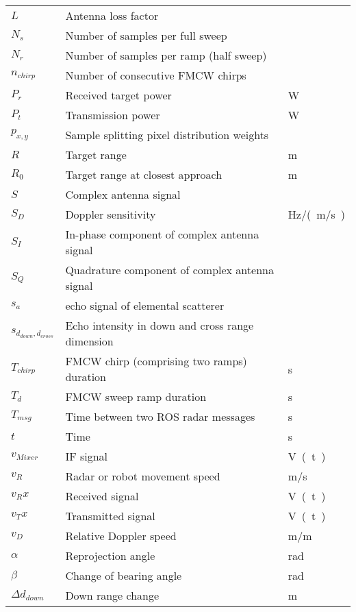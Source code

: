 \begin{listofsymbols}
\begin{tabularx}{\textwidth}{%
  >{\setlength{\hsize}{3cm}\raggedright\arraybackslash}X%
  X%
  >{\setlength{\hsize}{2cm}\raggedright\arraybackslash}X%
}
$L$ & Antenna loss factor                   & \\
$N_s$ & Number of samples per full sweep    & \\
$N_r$ & Number of samples per ramp (half sweep) & \\
$n_{chirp}$ & Number of consecutive FMCW chirps & \\
$P_r$ & Received target power               & \si{W} \\
$P_t$ & Transmission power                  & \si{W} \\
$p_{x,y}$ & Sample splitting pixel distribution weights & \\
$R$   & Target range                        & \si{m} \\
$R_0$ & Target range at closest approach    & \si{m} \\
$S$   & Complex antenna signal              & \\
$S_D$ & Doppler sensitivity                 & \si{Hz/(m/s)}\\
$S_I$ & In-phase component of complex antenna signal & \\
$S_Q$ & Quadrature component of complex antenna signal & \\
$s_a$ & echo signal of elemental scatterer  & \\
$s_{d_{down},d_{cross}}$ & Echo intensity in down and cross range dimension & \\
$T_{chirp}$ & FMCW chirp (comprising two ramps) duration & \si{s} \\
$T_d$ & FMCW sweep ramp duration            & \si{s} \\
$T_{msg}$ & Time between two ROS radar messages & \si{s} \\
$t$ & Time                                  & \si{s} \\
$v_{Mixer}$ & IF signal                     & \si{V(t)} \\
$v_R$ & Radar or robot movement speed       & \si{m/s} \\
$v_Rx$ & Received signal                    & \si{V(t)} \\
$v_Tx$ & Transmitted signal                 & \si{V(t)} \\
$v_D$ & Relative Doppler speed              & \si{m/m} \\
$\alpha$ & Reprojection angle               & \si{rad}\\
$\beta$ & Change of bearing angle           & \si{rad}\\
$\Delta d_{down}$ & Down range change       & \si{m}\\

\end{tabularx}
\end{listofsymbols}

